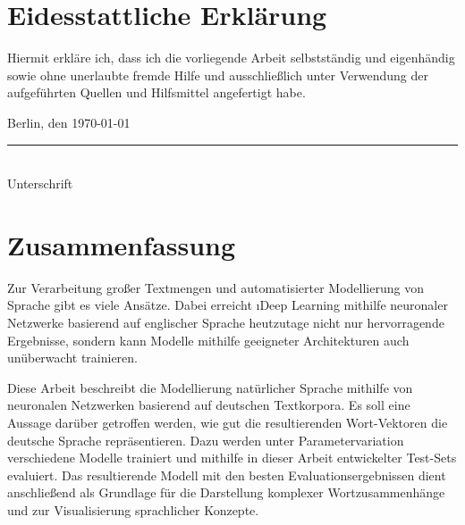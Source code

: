 \pagestyle{useheadings} %

\chapter*{Eidesstattliche Erklärung}
Hiermit erkläre ich, dass ich die vorliegende Arbeit selbstständig und eigenhändig sowie ohne unerlaubte fremde Hilfe und ausschließlich unter Verwendung der aufgeführten Quellen und Hilfsmittel angefertigt habe.

Berlin, den \today\\

\vspace{1cm}
\rule{.5\textwidth}{.5pt}\\
Unterschrift

\chapter*{Zusammenfassung}
Zur Verarbeitung großer Textmengen und automatisierter Modellierung von Sprache gibt es viele Ansätze. Dabei erreicht \i{Deep Learning} mithilfe neuronaler Netzwerke basierend auf englischer Sprache heutzutage nicht nur hervorragende Ergebnisse, sondern kann Modelle mithilfe geeigneter Architekturen auch unüberwacht trainieren.

Diese Arbeit beschreibt die Modellierung natürlicher Sprache mithilfe von neuronalen Netzwerken basierend auf deutschen Textkorpora. Es soll eine Aussage darüber getroffen werden, wie gut die resultierenden Wort-Vektoren die deutsche Sprache repräsentieren. Dazu werden unter Parametervariation verschiedene Modelle trainiert und mithilfe in dieser Arbeit entwickelter Test-Sets evaluiert. Das resultierende Modell mit den besten Evaluationsergebnissen dient anschließend als Grundlage für die Darstellung komplexer Wortzusammenhänge und zur Visualisierung sprachlicher Konzepte.\\


\begingroup
\renewcommand{\cleardoublepage}{}
\renewcommand{\clearpage}{}

